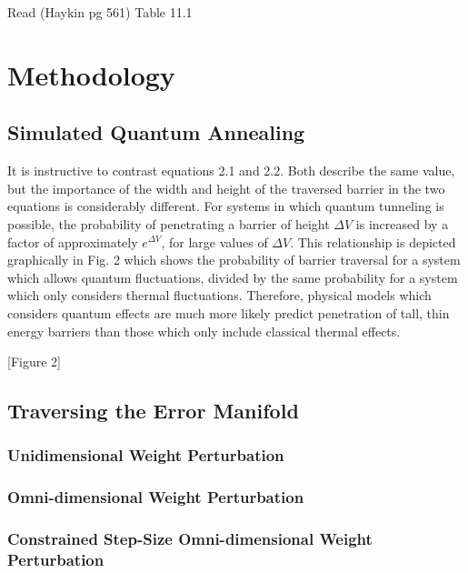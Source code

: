 \documentclass[11pt]{afthesis}
\begin{document}
Read (Haykin pg 561) Table 11.1


\chapter{Methodology}

\section{Simulated Quantum Annealing}

It is instructive to contrast equations 2.1 and 2.2. Both describe the same value, but the importance of the width and height of the traversed barrier in the two equations is considerably different. For systems in which quantum tunneling is possible, the probability of penetrating a barrier of height \begin{math} \Delta V \end{math} is increased by a factor of approximately \begin{math} e^{\Delta V} \end{math}, for large values of \begin{math} \Delta V \end{math}. This relationship is depicted graphically in Fig. 2 which shows the probability of barrier traversal for a system which allows quantum fluctuations, divided by the same probability for a system which only considers thermal fluctuations. Therefore, physical models which considers quantum effects are much more likely predict penetration of tall, thin energy barriers than those which only include classical thermal effects.


[Figure 2] 


\section{Traversing the Error Manifold}

\subsection{Unidimensional Weight Perturbation}

\subsection{Omni-dimensional Weight Perturbation}

\subsection{Constrained Step-Size Omni-dimensional Weight Perturbation}
\end{document}
